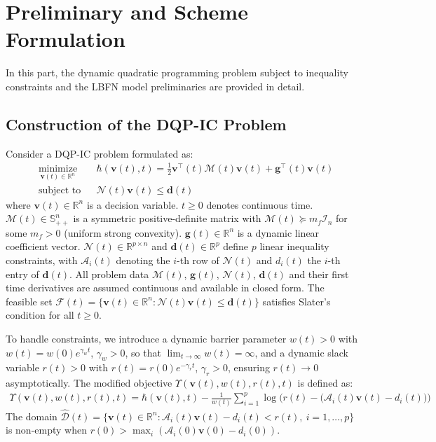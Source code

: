 \documentclass[pdflatex,sn-mathphys,Numbered]{sn-jnl}
\theoremstyle{thmstyleone}
\theoremstyle{thmstyletwo}
\theoremstyle{thmstylethree}
\begin{document}
\section{Preliminary and Scheme Formulation}\label{sec2}
In this part, the dynamic quadratic programming problem subject to inequality constraints and the LBFN model preliminaries are provided in detail.

\subsection{Construction of the DQP-IC Problem}\label{subsec21}
Consider a DQP-IC problem formulated as:
\begin{equation}
\begin{aligned}
& \underset{\bm{v}(t) \in \mathbb{R}^n}{\text{minimize}} & & \hbar(\bm{v}(t), t) = \frac{1}{2} \bm{v}^\top(t) \mathcal{M}(t) \bm{v}(t) + \bm{g}^\top(t)\bm{v}(t) \\
& \text{subject to} & & \mathcal{N}(t) \bm{v}(t) \leq \bm{d}(t)
\end{aligned}
\label{eq:problem}
\end{equation}
where $\bm{v}(t) \in \mathbb{R}^n$ is a decision variable. $t \geq 0$ denotes continuous time. $\mathcal{M}(t) \in \mathbb{S}^n_{++}$ is a symmetric positive-definite matrix with $\mathcal{M}(t) \succeq m_f \mathcal{I}_n$ for some $m_f > 0$ (uniform strong convexity). $\bm{g}(t) \in \mathbb{R}^n$ is a dynamic linear coefficient vector. $\mathcal{N}(t) \in \mathbb{R}^{p \times n}$ and $\bm{d}(t) \in \mathbb{R}^p$ define $p$ linear inequality constraints, with $\mathcal{A}_i(t)$ denoting the $i$-th row of $\mathcal{N}(t)$ and $d_i(t)$ the $i$-th entry of $\bm{d}(t)$. All problem data $\mathcal{M}(t)$, $\bm{g}(t)$, $\mathcal{N}(t)$, $\bm{d}(t)$ and their first time derivatives are assumed continuous and available in closed form. The feasible set $\mathcal{F}(t) = \{\bm{v}(t) \in \mathbb{R}^n : \mathcal{N}(t) \bm{v}(t) \leq \bm{d}(t)\}$ satisfies Slater's condition for all $t \geq 0$.

To handle constraints, we introduce a dynamic barrier parameter $w(t) > 0$ with $w(t) = w(0)e^{\gamma_w t}$, $\gamma_w>0$, so that $\lim_{t \to \infty} w(t) = \infty$, and a dynamic slack variable $r(t) > 0$ with $r(t) = r(0)e^{-\gamma_r t}$, $\gamma_r > 0$, ensuring $r(t) \to 0$ asymptotically.
The modified objective $\Upsilon(\bm{v}(t), w(t), r(t), t)$ is defined as:
\begin{equation}
\begin{aligned}
\Upsilon(\bm{v}(t), w(t), r(t), t) = \hbar(\bm{v}(t), t) - \frac{1}{w(t)} \sum_{i=1}^p \log \bigg( r(t) - \big( \mathcal{A}_i(t) \bm{v}(t) - d_i(t) \big) \bigg)
\end{aligned}
\label{eq:psi}
\end{equation}
The domain $\widehat{\mathcal{D}}(t) = \{ \bm{v}(t) \in \mathbb{R}^n : \mathcal{A}_i(t) \bm{v}(t) - d_i(t) < r(t),\ i=1,\dots,p \}$ is non-empty when $r(0) > \max_i (\mathcal{A}_i(0) \bm{v}(0) - d_i(0))$.
\end{document}
